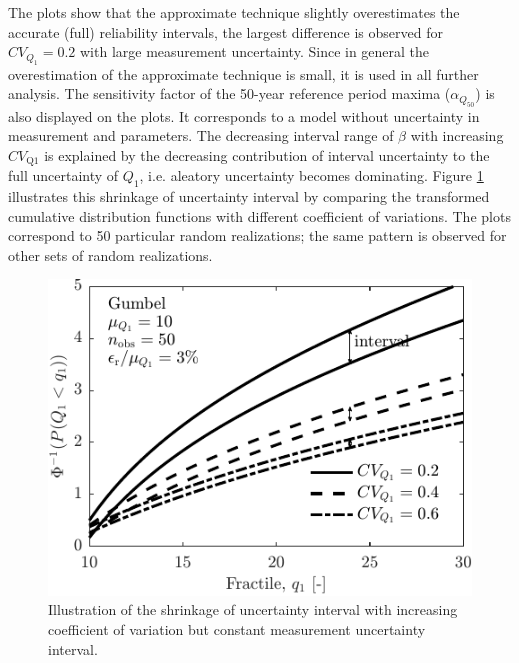 The plots show that the approximate technique slightly overestimates the accurate (full) reliability intervals, the largest difference is observed for $CV_{Q_1} = 0.2$ with large measurement uncertainty. Since in general the overestimation of the approximate technique is small, it is used in all further analysis. The sensitivity factor of the 50-year reference period maxima ($\alpha_{Q_{50}}$) is also displayed on the plots. It corresponds to a model without uncertainty in measurement and parameters. The decreasing interval range of $\beta$ with increasing $CV_\mathrm{Q1}$ is explained by the decreasing contribution of interval uncertainty to the full uncertainty of $Q_1$, i.e. aleatory uncertainty becomes dominating. Figure \ref{fig:explain_decr_beta_int} illustrates this shrinkage of uncertainty interval by comparing the transformed cumulative distribution functions with different coefficient of variations. The plots correspond to 50 particular random realizations; the same pattern is observed for other sets of random realizations.
\begin{figure}[htbp!] 
	\centering    
	\includegraphics[]{explain_decr_beta_int.pdf}
	\caption{Illustration of the shrinkage of uncertainty interval with increasing coefficient of variation but constant measurement uncertainty interval.}
	\label{fig:explain_decr_beta_int}
\end{figure}

